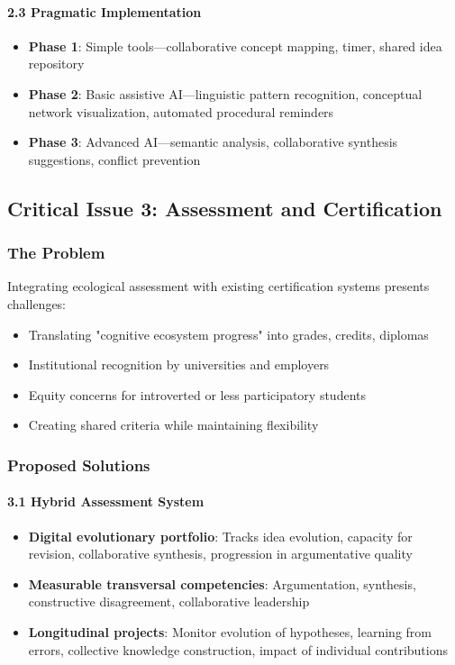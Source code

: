 \paragraph{2.3 Pragmatic Implementation}
\begin{itemize}
	\item \textbf{Phase 1}: Simple tools—collaborative concept mapping, timer, shared idea repository
	\item \textbf{Phase 2}: Basic assistive AI—linguistic pattern recognition, conceptual network visualization, automated procedural reminders
	\item \textbf{Phase 3}: Advanced AI—semantic analysis, collaborative synthesis suggestions, conflict prevention
\end{itemize}

\subsection{Critical Issue 3: Assessment and Certification}

\subsubsection*{The Problem}
Integrating ecological assessment with existing certification systems presents challenges:
\begin{itemize}
	\item Translating "cognitive ecosystem progress" into grades, credits, diplomas
	\item Institutional recognition by universities and employers
	\item Equity concerns for introverted or less participatory students
	\item Creating shared criteria while maintaining flexibility
\end{itemize}

\subsubsection*{Proposed Solutions}

\paragraph{3.1 Hybrid Assessment System}
\begin{itemize}
	\item \textbf{Digital evolutionary portfolio}: Tracks idea evolution, capacity for revision, collaborative synthesis, progression in argumentative quality
	\item \textbf{Measurable transversal competencies}: Argumentation, synthesis, constructive disagreement, collaborative leadership
	\item \textbf{Longitudinal projects}: Monitor evolution of hypotheses, learning from errors, collective knowledge construction, impact of individual contributions
\end{itemize}


